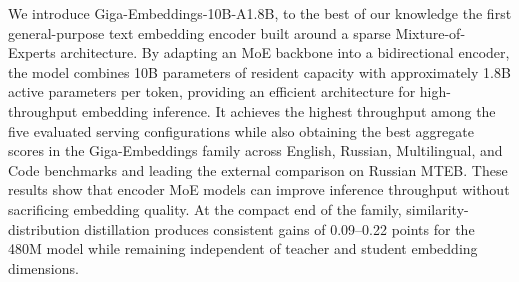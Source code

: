\documentclass{article}
\begin{document}
We introduce Giga-Embeddings-10B-A1.8B, to the best of our knowledge the first general-purpose text embedding encoder built around a sparse Mixture-of-Experts architecture.
By adapting an MoE backbone into a bidirectional encoder, the model combines 10B parameters of resident capacity with approximately 1.8B active parameters per token, providing an efficient architecture for high-throughput embedding inference.
It achieves the highest throughput among the five evaluated serving configurations while also obtaining the best aggregate scores in the Giga-Embeddings family across English, Russian, Multilingual, and Code benchmarks and leading the external comparison on Russian MTEB.
These results show that encoder MoE models can improve inference throughput without sacrificing embedding quality.
At the compact end of the family, similarity-distribution distillation produces consistent gains of 0.09--0.22 points for the 480M model while remaining independent of teacher and student embedding dimensions.

\FloatBarrier


\end{document}
